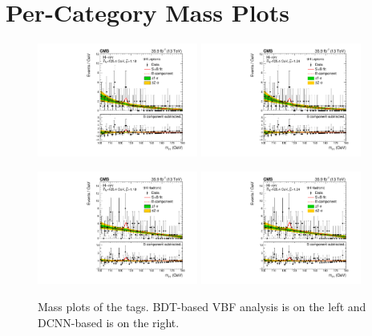 
\chapter{Per-Category Mass Plots}
\label{appendix:mass_plots}
\begin{figure}[h!]
    \begin{center}
        \includegraphics[width=0.47\textwidth]{figures/appendix_mass_plots/CMS-HIG-16-040_Figure_012-d.pdf}
        \includegraphics[width=0.47\textwidth]{figures/appendix_mass_plots/SBplots_jackWSnewOldTTHTTHLeptonicTag_13TeV.pdf}
    \end{center}
    \begin{center}
        \includegraphics[width=0.47\textwidth]{figures/appendix_mass_plots/CMS-HIG-16-040_Figure_012-e.pdf}
        \includegraphics[width=0.47\textwidth]{figures/appendix_mass_plots/SBplots_jackWSnewOldTTHTTHHadronicTag_13TeV.pdf}
    \end{center}
    \label{fig:app_mass_plots:tth}
    \caption{Mass plots of the \ttH tags. BDT-based VBF analysis is on the left and DCNN-based is on the right.}
\end{figure}

